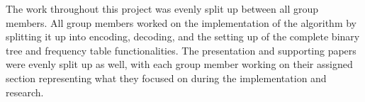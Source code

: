 \documentclass[12pt]{IEEEtran}
\begin{document}
The work throughout this project was evenly split up between all group members.
All group members worked on the implementation of the algorithm by splitting it up
into encoding, decoding, and the setting up of the complete binary tree and frequency table functionalities.
The presentation and supporting papers were evenly split up as well, with each group member working on their assigned section
representing what they focused on during the implementation and research.




\end{document}
